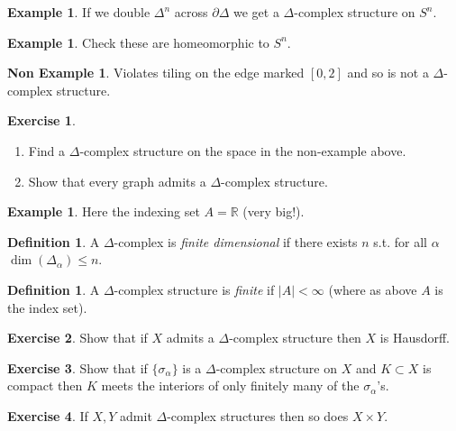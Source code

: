 \documentclass[12pt]{article}
\theoremstyle{definition}
\theoremstyle{definition}
\newtheorem{defn}[thm]{Definition}
\newtheorem{ex}[thm]{Example}
\newtheorem{nex}[thm]{Non Example}
\newtheorem*{exer}{Exercise}
\newcommand{\RR}{\mathbb{R}}
\begin{document}
\begin{ex}
If we double $\Delta^n$ across $\partial \Delta$ we get a $\Delta$-complex structure on $S^n$.
\end{ex}

\begin{ex}
Check these are homeomorphic to $S^n$.
\end{ex}

\begin{nex}
Violates tiling on the edge marked $[0,2]$ and so is not a $\Delta$-complex structure.
\end{nex}

\begin{exer}
\begin{enumerate}
\item Find a $\Delta$-complex structure on the space in the non-example above.
\item Show that every graph admits a $\Delta$-complex structure.
\end{enumerate}
\end{exer}

\begin{ex}
Here the indexing set $A = \RR$ (very big!).
\end{ex}

\begin{defn}
A $\Delta$-complex is \emph{finite dimensional} if there exists $n$ s.t. for all $\alpha$ $\dim(\Delta_\alpha) \le n$.
\end{defn}

\begin{defn}
A $\Delta$-complex structure is \emph{finite} if $|A| < \infty$ (where as above $A$ is the index set).
\end{defn}

\begin{exer}
Show that if $X$ admits a $\Delta$-complex structure then $X$ is Hausdorff.
\end{exer}

\begin{exer}
Show that if $\{\sigma_\alpha\}$ is a $\Delta$-complex structure on $X$ and $K\subset X$ is compact then $K$ meets the interiors of only finitely many of the $\sigma_\alpha$'s.
\end{exer}

\begin{exer}
If $X,Y$ admit $\Delta$-complex structures then so does $X\times Y$.
\end{exer}
\end{document}
